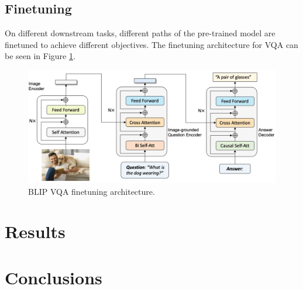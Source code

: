 \documentclass[11pt]{article}
\begin{document}
\subsection{Finetuning}

On different downstream tasks, different paths of the pre-trained model are finetuned to achieve different objectives. The finetuning architecture for VQA can be seen in Figure \ref{fig:vqa_example}.

\begin{figure}
    \centering
    \includegraphics[width=\linewidth]{vqa_example.png}
    \caption{BLIP VQA finetuning architecture.}
    \label{fig:vqa_example}
\end{figure}

\section{Results}

\section{Conclusions}



\end{document}
